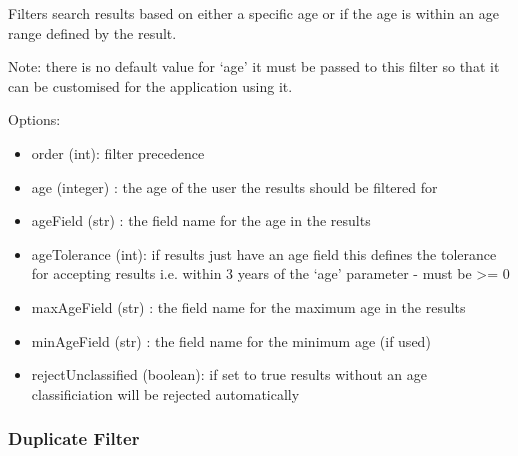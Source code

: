 \documentclass[letterpaper,10pt,english]{sphinxmanual}
\begin{document}
\begin{fulllineitems}
\label{api3.0:puppy.result.filter.AgeFilter}
Filters search results based on either a specific age or if the age is within an age range defined by the result.

Note: there is no default value for `age' it must be passed to this filter so that it can be customised for the application using it.

Options:
\begin{itemize}
\item {} 
order (int): filter precedence

\item {} 
age (integer) : the age of the user the results should be filtered for

\item {} 
ageField (str) : the field name for the age in the results

\item {} 
ageTolerance (int): if results just have an age field this defines the tolerance for accepting results i.e. within 3 years of the `age' parameter - must be \textgreater{}= 0

\item {} 
maxAgeField (str) : the field name for the maximum age in the results

\item {} 
minAgeField (str) : the field name for the minimum age (if used)

\item {} 
rejectUnclassified (boolean): if set to true results without an age classificiation will be rejected automatically

\end{itemize}

\end{fulllineitems}



\subsubsection{Duplicate Filter}
\label{api3.0:duplicate-filter}
\end{document}
